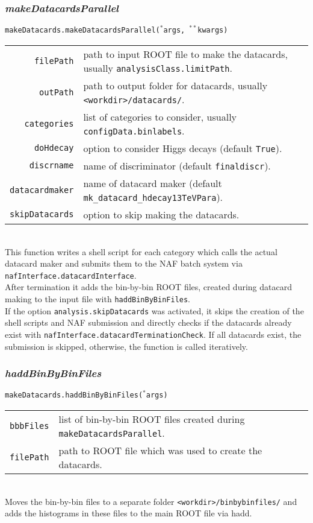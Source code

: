 \documentclass[12pt, a4paper]{article}
\newcommand{\args}{$^*$args}
\newcommand{\kwargs}{$^{**}$kwargs}
\begin{document}
\subsubsection{\textit{makeDatacardsParallel}}
\texttt{makeDatacards.makeDatacardsParallel(\args, \kwargs)}\\
\begin{tabular}{r|l}
\hline
\texttt{filePath}		&	path to input ROOT file to make the datacards, usually \texttt{analysisClass.limitPath}.\\
\texttt{outPath}		&	path to output folder for datacards, usually \texttt{<workdir>/datacards/}.\\
\texttt{categories}		&	list of categories to consider, usually \texttt{configData.binlabels}.\\
\texttt{doHdecay}		&	option to consider Higgs decays (default \texttt{True}).\\
\texttt{discrname}		&	name of discriminator (default \texttt{finaldiscr}).\\
\texttt{datacardmaker}	&	name of datacard maker (default \texttt{mk\_datacard\_hdecay13TeVPara}).\\
\texttt{skipDatacards}	&	option to skip making the datacards.\\
\hline
\end{tabular}
\\
This function writes a shell script for each category which calls the actual datacard maker and submits them to the NAF batch system via \texttt{nafInterface.datacardInterface}.\\
After termination it adds the bin-by-bin ROOT files, created during datacard making to the input file with \texttt{haddBinByBinFiles}.\\
If the option \texttt{analysis.skipDatacards} was activated, it skips the creation of the shell scripts and NAF submission and directly checks if the datacards already exist with \texttt{nafInterface.datacardTerminationCheck}. If all datacards exist, the submission is skipped, otherwise, the function is called iteratively.\\


\subsubsection{\textit{haddBinByBinFiles}}
\texttt{makeDatacards.haddBinByBinFiles(\args)}\\
\begin{tabular}{r|l}
\hline
\texttt{bbbFiles}		&	list of bin-by-bin ROOT files created during \texttt{makeDatacardsParallel}.\\
\texttt{filePath}		&	path to ROOT file which was used to create the datacards.\\
\hline
\end{tabular}
\\
Moves the bin-by-bin files to a separate folder \texttt{<workdir>/binbybinfiles/} and adds the histograms in these files to the main ROOT file via hadd.
\end{document}

